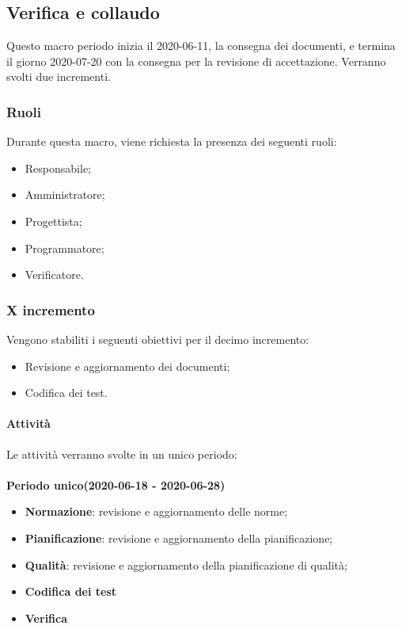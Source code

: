\documentclass[../piano-di-progetto.tex]{subfiles}
\begin{document}
\subsection{Verifica e collaudo}
Questo macro periodo inizia il 2020-06-11, la consegna dei documenti, e termina il giorno 2020-07-20 con la consegna per la revisione di accettazione. Verranno svolti due incrementi.

\subsubsection{Ruoli}
Durante questa macro, viene richiesta la presenza dei seguenti ruoli:
\begin{itemize}
    \item Responsabile;
    \item Amministratore;
    \item Progettista;
    \item Programmatore;
    \item Verificatore.
\end{itemize}

\subsubsection{X incremento}
 Vengono stabiliti i seguenti obiettivi per il decimo incremento:
 \begin{itemize}
     \item Revisione e aggiornamento dei documenti;
     \item Codifica dei test.
 \end{itemize}

\paragraph{Attività}
Le attività verranno svolte in un unico periodo:
\\
\\
\textbf{Periodo unico(2020-06-18 - 2020-06-28)}
\begin{itemize}
        \item \textbf{Normazione}: revisione e aggiornamento delle norme;
        \item \textbf{Pianificazione}: revisione e aggiornamento della pianificazione;
        \item \textbf{Qualità}: revisione e aggiornamento della pianificazione di qualità;
        \item \textbf{Codifica dei test}
        \item \textbf{Verifica}
\end{itemize}
\end{document}
